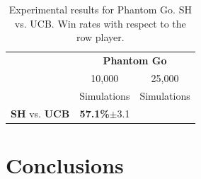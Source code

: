 \documentclass[a4paper]{llncs}
\begin{document}
\begin{table}[ht]
\centering
\setlength{\tabcolsep}{10pt}
\begin{tabular}{@{}lrr@{}}
\toprule
& \multicolumn{2}{c}{\textbf{Phantom Go}} \\
& \multicolumn{1}{c}{10,000} & \multicolumn{1}{c}{25,000} \\
& \multicolumn{1}{c}{Simulations} & \multicolumn{1}{c}{Simulations} \\ [1mm] \cmidrule(l){1-3}
\textbf{SH} vs. \textbf{UCB} &	\textbf{57.1\%}$\pm$3.1	&	\\ [.5mm]
\bottomrule
\end{tabular}
\vspace{2mm}
{\caption{Experimental results for Phantom Go. SH vs. UCB. Win rates with respect to the row player.} \label{tab:ph_go}}
\end{table}

\section{Conclusions}
\label{sec:concl}



\end{document}
